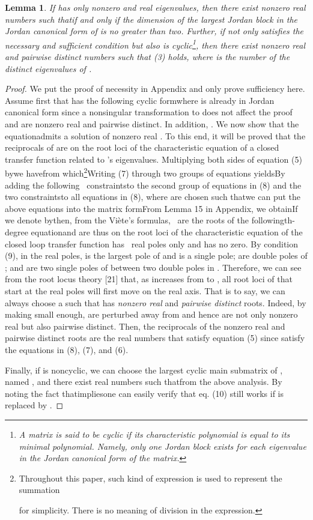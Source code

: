 \documentclass[journal,a4paper,12pt,onecolumn]{IEEEtran}
\newtheorem{lemma}[theorem]{Lemma}
\begin{document}
\begin{lemma}
If  has only nonzero and real eigenvalues, then there exist
nonzero real numbers  such thatif and only if the dimension of the largest Jordan block in the Jordan
canonical form of  is no greater than two. Further, if  not only
satisfies the necessary and sufficient condition but also is cyclic\footnote{A matrix is said to be cyclic if its characteristic polynomial is equal to
its minimal polynomial. Namely, only one Jordan block exists for each
eigenvalue in the Jordan canonical form of the matrix.}, then there exist  nonzero real and pairwise distinct numbers  such that (3) holds, where  is the number of the distinct eigenvalues
of .
\end{lemma}

\begin{proof}
We put the proof of necessity in Appendix and only prove sufficiency here.
Assume first that  has the following cyclic formwhere  is already in Jordan canonical form since a nonsingular
transformation to  does not affect the proof and  are nonzero real and pairwise distinct. In addition, .
We now show that the equationadmits a solution of nonzero real . To this end, it will be
proved that the reciprocals of  are on the root loci of the
characteristic equation of a closed transfer function related to 's
eigenvalues. Multiplying both sides of equation (5) bywe havefrom which\footnote{Throughout this paper, such kind of expression  is used to represent the summation
\par
for simplicity. There is no meaning of division in the expression.}Writing (7) through two groups of equations yieldsBy adding the following \ constraintsto the second group of equations in (8) and the two constraintsto all equations in (8), where  are chosen
such thatwe can put the above 
equations into the matrix formFrom Lemma 15 in Appendix, we obtainIf we denote  bythen, from the Vi\`{e}te's formulas, \ are the roots of the followingth-degree equationand are thus on the root loci of the characteristic equation of the closed
loop transfer function has \ real poles only and has no
zero. By condition (9), in the  real poles,  is the largest pole of  and is a single pole;  are double poles of ;  and  are two single poles of 
between two double poles in .
Therefore, we can see from the root locus theory [21] that, as  increases
from  to , all root loci of  that start
at the  real poles will first move on the real axis.
That is to say, we can always choose a  such that 
has  \textit{nonzero real} and \textit{pairwise distinct} roots. Indeed, by making  small enough,  are perturbed away from 
and hence are not only nonzero real but also pairwise distinct. Then, the
reciprocals of the nonzero real and pairwise distinct roots are the real
numbers that satisfy equation (5) since  satisfy the equations in (8), (7), and (6).

Finally, if  is noncyclic, we can choose the largest cyclic main
submatrix of , named , and there exist real numbers 
such thatfrom the above analysis. By noting the fact thatimpliesone can easily verify that eq. (10) still works if  is replaced by .
\end{proof}
\end{document}
